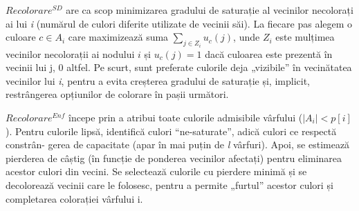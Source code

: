 \begin{algorithm}[H]
\caption{$Recolorare^{SD}$ ($i$)}\label{alg:RSD}
\begin{algorithmic}[1]
\small
{}
\EndWhile{}
\end{algorithmic}
\end{algorithm}
$Recolorare^{SD}$  are ca scop  minimizarea gradului de saturație al vecinilor necolorați ai lui \textit{i} (numărul de culori diferite utilizate de vecinii săi). La fiecare pas alegem o culoare $c \in A_i$ care maximizează suma $\sum_{j \in Z_i} u_c(j)$, unde $Z_i$ este mulțimea vecinilor necolorații ai nodului $i$ și $u_c(j)=1$ dacă culoarea este prezentă în vecinii lui j, 0 altfel. Pe scurt, sunt preferate culorile deja „vizibile” în vecinătatea vecinilor lui \textit{i}, pentru a evita creșterea gradului de saturație și, implicit, restrângerea opțiunilor de colorare în pașii următori.
\vspace{1cm}
\begin{algorithm}[H]
\caption{$Recolorare^{Enf}$ ($i$)}\label{alg:RENF}
\begin{algorithmic}[1]
\small
    \EndFor{}
        \EndFor{}
    \EndWhile{}

\end{algorithmic}
\end{algorithm}

      


$Recolorare^{Enf}$  începe prin a atribui toate culorile admisibile vârfului ($|A_i|<p[i]$). Pentru culorile lipsă, identifică culori ``ne-saturate'', adică culori ce respectă constrân- gerea de capacitate (apar în mai puțin de \textit{l} vârfuri). Apoi, se estimează pierderea de câștig (în funcție de ponderea vecinilor afectați) pentru eliminarea acestor culori din vecini. Se selectează culorile cu pierdere minimă și se decolorează vecinii care le folosesc, pentru a permite „furtul” acestor culori și completarea colorației vârfului i.







